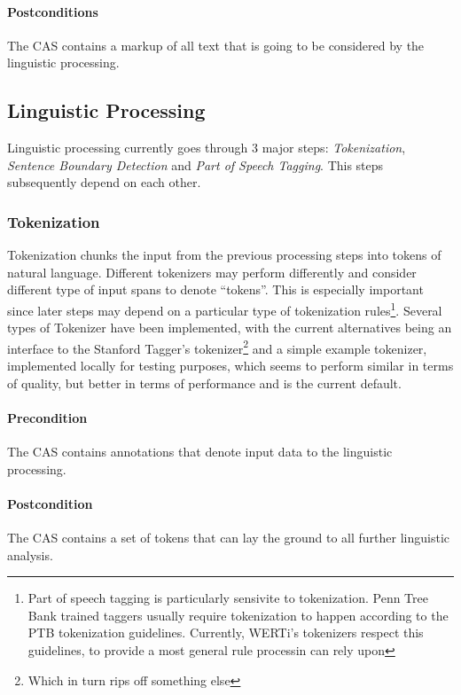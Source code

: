 \documentclass[12pt]{article}
\begin{document}
\paragraph{Postconditions} The CAS contains a markup of all text that is going
to be considered by the linguistic processing.

\subsection{Linguistic Processing}

Linguistic processing currently goes through 3 major steps: \emph{Tokenization},
\emph{Sentence Boundary Detection} and \emph{Part of Speech Tagging}. This
steps subsequently depend on each other.

\subsubsection{Tokenization}

Tokenization chunks the input from the previous processing steps into tokens of
natural language. Different tokenizers may perform differently and consider
different type of input spans to denote ``tokens''. This is especially important
since later steps may depend on a particular type of tokenization 
rules\footnote{Part of speech tagging is particularly sensivite to
tokenization. Penn Tree Bank trained taggers usually require tokenization to
happen according to the PTB tokenization guidelines. Currently, WERTi's
tokenizers respect this guidelines, to provide a most general rule processin can
rely upon}. Several types of Tokenizer have been implemented, with the current
alternatives being an interface to the Stanford Tagger's
tokenizer\footnote{Which in turn rips off something else} %
and a simple example tokenizer, implemented locally for testing purposes, which
seems to perform similar in terms of quality, but better in terms of performance
and is the current default.

\paragraph{Precondition} The CAS contains annotations that denote input data to
the linguistic processing.
\paragraph{Postcondition} The CAS contains a set of tokens that can lay the
ground to all further linguistic analysis.
\end{document}
